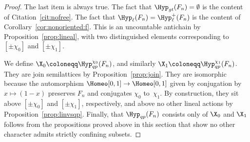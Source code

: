 \begin{proof}
The last item is always true. The fact that $\Hyp_{gt}(F_n) = \emptyset$ is the content of Citation~\ref{cit:nofree}. The fact that $\Hyp_{\ell}(F_n) = \Hyp_{\ell}^+(F_n)$ is the content of Corollary~\ref{cor:nonoriented:f}. This is an uncountable antichain by Proposition~\ref{prop:lineal}, with two distinguished elements corresponding to $[\pm\chi_0]$ and $[\pm\chi_1]$.

We define $\X_0 \coloneqq \Hyp_{qp}^{\chi_0}(F_n)$, and similarly $\X_1 \coloneqq \Hyp_{qp}^{\chi_1}(F_n)$. They are join semilattices by Proposition~\ref{prop:join}. They are isomorphic because the automorphism $\Homeo[0, 1] \to \Homeo[0, 1]$ given by conjugation by $x \mapsto (1 - x)$ preserves $F_n$ and conjugates $\chi_0$ to~$\chi_1$. By construction, they sit above $[\pm\chi_0]$ and $[\pm\chi_1]$, respectively, and above no other lineal actions by Proposition~\ref{prop:linvsqp}. Finally, that $\Hyp_{qp}(F_n)$ consists only of $\X_0$ and $\X_1$ follows from the propositions proved above in this section that show no other character admits strictly confining subsets.
\end{proof}
